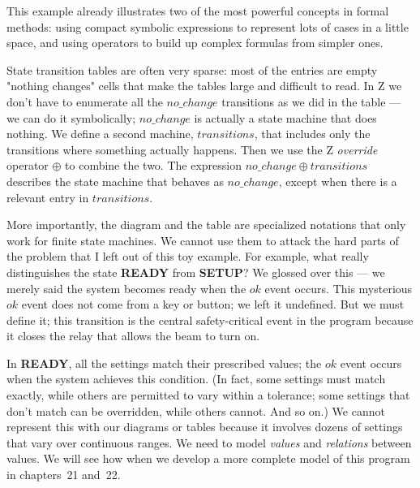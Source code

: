 This example already illustrates two of the most powerful concepts in formal
methods: using compact symbolic expressions to represent lots of cases in a
little space, and using operators to build up complex formulas from simpler
ones.

State transition tables are often very sparse: most of the entries are
empty "nothing changes" cells that make the tables large and
difficult to read.  In Z we don't have to enumerate all the
$no\_change$ transitions as we did in the table --- we can do it
symbolically; $no\_change$ is actually a state machine that does
nothing.  We define a second machine, $transitions$, that includes
only the transitions where something actually happens.  Then we use
the Z {\em override} operator $\oplus$ to combine the two.  The
expression \mbox{$no\_change \oplus transitions$} describes the state
machine that behaves as $no\_change$, except when there is a relevant
entry in $transitions$. 

More importantly, the diagram and the table are specialized notations that
only work for finite state machines.  We cannot use them  to attack the
hard parts of the problem that I left out of this toy example.
For example, what really distinguishes the state {\bf READY} from
{\bf SETUP}?  We glossed over this --- we merely said the system becomes
ready when the $ok$ event occurs.  This mysterious $ok$ event does not
come from a key or button; we left it undefined.  But we must define
it; this transition is the central safety-critical event in the
program because it closes the relay that allows the beam to turn on.

In {\bf READY}, all the settings match their prescribed values; the $ok$
event occurs when the system achieves this condition. (In fact, some
settings must match exactly, while others are permitted to vary within a
tolerance; some settings that don't match can be overridden, while others
cannot.  And so on.) We cannot represent this with our diagrams or tables
because it involves dozens of settings that vary over continuous ranges.  We
need to model {\em values} and {\em relations} between values.  We will see
how when we develop a more complete model of this program in
chapters~21 and~22.



 
